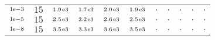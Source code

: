 \begin{tiny}
\begin{tabular}{@{$\;$}c@{$\;$}|@{$\;$}c@{$\;$}@{$\;$}c@{$\;$}@{$\;$}c@{$\;$}@{$\;$}c@{$\;$}@{$\;$}c@{$\;$}|@{$\;$}c@{$\;$}@{$\;$}c@{$\;$}@{$\;$}c@{$\;$}@{$\;$}c@{$\;$}@{$\;$}c@{$\;$}}
$\scriptstyle1\!\mathrm{\hspace{0.10em}e}-3$ & $\scriptstyle15$ & $\scriptstyle1.9\mathrm{\hspace{0.10em}e}3$ & $\scriptstyle1.7\mathrm{\hspace{0.10em}e}3$ & $\scriptstyle2.0\mathrm{\hspace{0.10em}e}3$ & $\scriptstyle1.9\mathrm{\hspace{0.10em}e}3$ & $\scriptstyle.$ & $\scriptstyle.$ & $\scriptstyle.$ & $\scriptstyle.$ & $\scriptstyle.$\\ 
$\scriptstyle1\!\mathrm{\hspace{0.10em}e}-5$ & $\scriptstyle15$ & $\scriptstyle2.5\mathrm{\hspace{0.10em}e}3$ & $\scriptstyle2.2\mathrm{\hspace{0.10em}e}3$ & $\scriptstyle2.6\mathrm{\hspace{0.10em}e}3$ & $\scriptstyle2.5\mathrm{\hspace{0.10em}e}3$ & $\scriptstyle.$ & $\scriptstyle.$ & $\scriptstyle.$ & $\scriptstyle.$ & $\scriptstyle.$\\ 
$\scriptstyle1\!\mathrm{\hspace{0.10em}e}-8$ & $\scriptstyle15$ & $\scriptstyle3.5\mathrm{\hspace{0.10em}e}3$ & $\scriptstyle3.3\mathrm{\hspace{0.10em}e}3$ & $\scriptstyle3.6\mathrm{\hspace{0.10em}e}3$ & $\scriptstyle3.5\mathrm{\hspace{0.10em}e}3$ & $\scriptstyle.$ & $\scriptstyle.$ & $\scriptstyle.$ & $\scriptstyle.$ & $\scriptstyle.$\\ 
\end{tabular} 
\end{tiny} 
